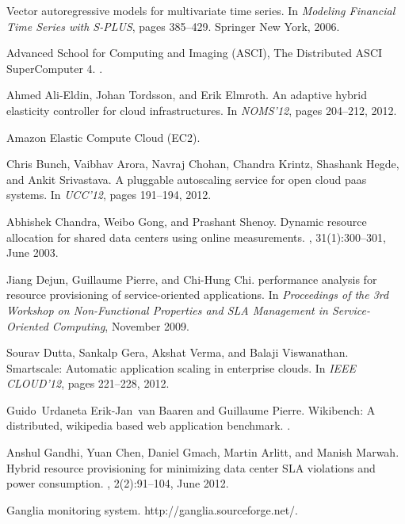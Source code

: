\documentclass{sig-alternate-10pt}
\begin{document}
\begin{thebibliography}{10}

Vector autoregressive models for multivariate time series.
\newblock In {\em Modeling Financial Time Series with S-PLUS}, pages 385--429.
  Springer New York, 2006.

{ Advanced School for Computing and Imaging (ASCI), The Distributed ASCI
  SuperComputer 4. }.

Ahmed Ali-Eldin, Johan Tordsson, and Erik Elmroth.
\newblock An adaptive hybrid elasticity controller for cloud infrastructures.
\newblock In {\em NOMS'12}, pages 204--212, 2012.

{Amazon Elastic Compute Cloud (EC2)}.

Chris Bunch, Vaibhav Arora, Navraj Chohan, Chandra Krintz, Shashank Hegde, and
  Ankit Srivastava.
\newblock A pluggable autoscaling service for open cloud paas systems.
\newblock In {\em UCC'12}, pages 191--194, 2012.

Abhishek Chandra, Weibo Gong, and Prashant Shenoy.
\newblock Dynamic resource allocation for shared data centers using online
  measurements.
, 31(1):300--301, June 2003.

Jiang Dejun, Guillaume Pierre, and Chi-Hung Chi.
 performance analysis for resource provisioning of
  service-oriented applications.
\newblock In {\em Proceedings of the 3rd Workshop on Non-Functional Properties
  and SLA Management in Service-Oriented Computing}, November 2009.

Sourav Dutta, Sankalp Gera, Akshat Verma, and Balaji Viswanathan.
\newblock Smartscale: Automatic application scaling in enterprise clouds.
\newblock In {\em IEEE CLOUD'12}, pages 221--228, 2012.

Guido~Urdaneta Erik-Jan~van Baaren and Guillaume Pierre.
\newblock Wikibench: A distributed, wikipedia based web application benchmark.
.

Anshul Gandhi, Yuan Chen, Daniel Gmach, Martin Arlitt, and Manish Marwah.
\newblock Hybrid resource provisioning for minimizing data center {SLA}
  violations and power consumption.
, 2(2):91--104,
  June 2012.

{Ganglia monitoring system. http://ganglia.sourceforge.net/}.


\end{thebibliography}
\end{document}
